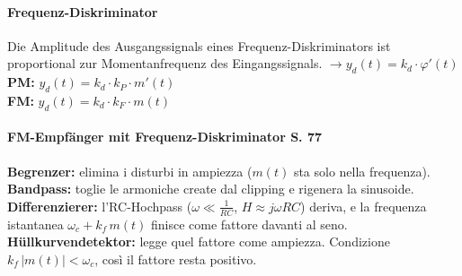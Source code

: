 \paragraph{Frequenz-Diskriminator}
Die Amplitude des Ausgangssignals eines Frequenz-Diskriminators ist proportional zur Momentanfrequenz des Eingangssignals. $\rightarrow y_d(t) = k_d \cdot \varphi'(t)$ \\
\textbf{PM:} $y_d(t)=k_d\cdot k_P \cdot m'(t)$ \\
\textbf{FM:} $y_d(t) = k_d \cdot k_F \cdot m(t)$

\paragraph{FM-Empfänger mit Frequenz-Diskriminator S. 77}
\begin{center}
	
\end{center}
\textbf{Begrenzer:} elimina i disturbi in ampiezza ($m(t)$ sta solo nella frequenza). \textbf{Bandpass:} toglie le armoniche create dal clipping e rigenera la sinusoide. \textbf{Differenzierer:} l'RC-Hochpass ($\omega\ll\frac{1}{RC}$, $H\approx j\omega RC$) deriva, e la frequenza istantanea $\omega_c+k_f\,m(t)$ finisce come fattore davanti al seno. \textbf{Hüllkurvendetektor:} legge quel fattore come ampiezza. Condizione $k_f\,|m(t)|<\omega_c$, così il fattore resta positivo.
